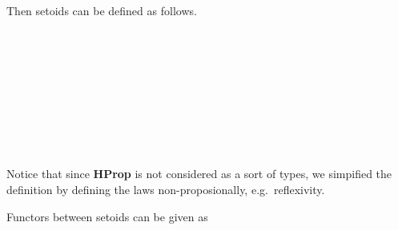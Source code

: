 Then setoids can be defined as follows.

\begin{code}\>\<%
\\
\>  \AgdaSymbol{:}  \<%
\\
\>[0]\<[2]%
\>[2]\<%
\\
\>[2]\<[4]%
\>[4] \AgdaSymbol{:} \<%
\\
\>[2]\<[4]%
\>[4] \<[13]%
\>[13]\AgdaSymbol{:}     \<%
\\
\>[2]\<[4]%
\>[4] \<[12]%
\>[12]\AgdaSymbol{:} \AgdaSymbol{\{} \AgdaSymbol{:} \AgdaSymbol{\}}  \AgdaFunction{<}    \AgdaFunction{>}\<%
\\
\>[2]\<[4]%
\>[4] \<[12]%
\>[12]\AgdaSymbol{:} \AgdaSymbol{\{}  \AgdaSymbol{:} \AgdaSymbol{\}}  \AgdaFunction{<}    \AgdaFunction{>}  \AgdaFunction{<}    \AgdaFunction{>}\<%
\\
\>[2]\<[4]%
\>[4] \<[12]%
\>[12]\AgdaSymbol{:} \AgdaSymbol{\{}   \AgdaSymbol{:} \AgdaSymbol{\}}  \AgdaFunction{<}    \AgdaFunction{>}  \AgdaFunction{<}    \AgdaFunction{>}  \AgdaFunction{<}    \AgdaFunction{>}\<%
\\
\>\<\end{code}

Notice that since \textbf{HProp} is not considered as a sort of types, we simpified the definition by defining the laws non-proposionally, e.g.\ reflexivity.



Functors between setoids can be given as

